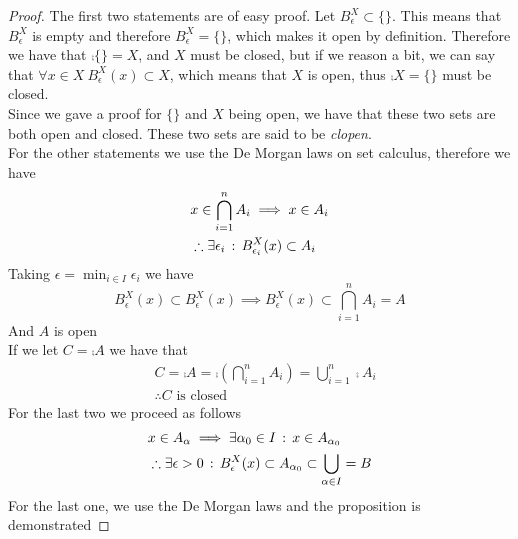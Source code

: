 \documentclass[../complete.tex]{subfiles}
\begin{document}
\begin{proof}
	The first two statements are of easy proof. Let $B^X_\epsilon\subset\{\}$. This means that $B^X_\epsilon$ is empty and therefore $B^X_\epsilon=\{\}$, which makes it open by definition. Therefore we have that $\comp{\{\}}=X$, and $X$ must be closed, but if we reason a bit, we can say that $\forall x\in X\ B_\epsilon^X(x)\subset X$, which means that $X$ is open, thus $\comp{X}=\{\}$ must be closed.\\
	Since we gave a proof for $\{\}$ and $X$ being open, we have that these two sets are both open and closed. These two sets are said to be \textit{clopen}.\\
	For the other statements we use the De Morgan laws on set calculus, therefore we have
	\begin{equation*}
		\begin{aligned}
			&x\in\bigcap_{i=1}^nA_i\implies x\in A_i\\
			&\therefore\exists\epsilon_i\, :\,  B^X_{\epsilon_i}(x)\subset A_i\\
		\end{aligned}
	\end{equation*}
	Taking $\epsilon=\min_{i\in I}\epsilon_i$ we have
	\begin{equation*}
		B_\epsilon^X(x)\subset B_\epsilon^X(x)\implies B_\epsilon^X(x)\subset\bigcap_{i=1}^nA_i=A
	\end{equation*}
	And $A$ is open\\
	If we let $C=\comp{A}$ we have that\\
	\begin{equation*}
		\begin{aligned}
			&C=\comp{A}=\comp{\left( \bigcap_{i=1}^nA_i \right)}=\bigcup_{i=1}^n\comp{A}_i\\
			&\therefore{C}\text{ is closed}
		\end{aligned}
	\end{equation*}
	For the last two we proceed as follows
	\begin{equation*}
		\begin{aligned}
			&x\in A_\alpha\implies\exists\alpha_0\in I\, :\,  x\in A_{\alpha_0}\\
			&\therefore\exists\epsilon>0\, :\,  B_{\epsilon}^X(x)\subset A_{\alpha_0}\subset\bigcup_{\alpha\in I}=B
		\end{aligned}
	\end{equation*}
	For the last one, we use the De Morgan laws and the proposition is demonstrated
\end{proof}
\end{document}
